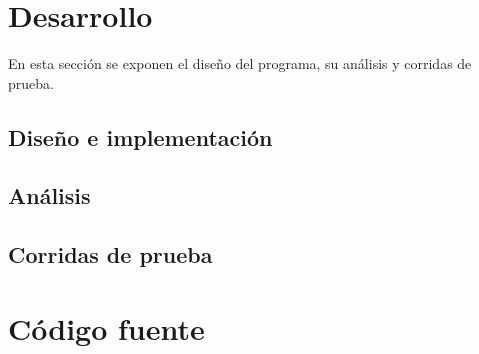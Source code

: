 \documentclass[10pt,a4paper]{article}
\begin{document}
		

	\section{Desarrollo}
		En esta sección se exponen el diseño del programa, su análisis y corridas de prueba.

		\subsection{Diseño e implementación}	\label{sec:diseño}
			

		\subsection{Análisis} 			\label{sec:analisis}
			

		\subsection{Corridas de prueba}
			
	\section{Código fuente}
		\lstlistoflistings
		
\end{document}
